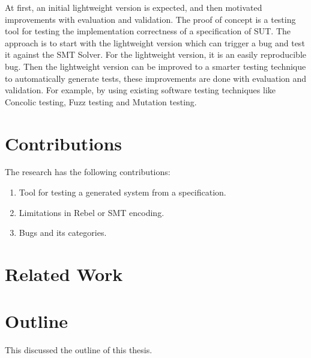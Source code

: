 At first, an initial lightweight version is expected, and then motivated
improvements with evaluation and validation. The proof of concept is a testing
tool for testing the implementation correctness of a specification of SUT. The
approach is to start with the lightweight version which can trigger a bug and
test it against the SMT Solver. For the lightweight version, it is an easily
reproducible bug. Then the lightweight version can be improved to a smarter
testing technique to automatically generate tests, these improvements are done
with evaluation and validation. For example, by using existing software testing
techniques like Concolic testing, Fuzz testing and Mutation testing.

\section{Contributions}
The research has the following contributions:

\begin{enumerate}
  \item Tool for testing a generated system from a specification.
  \item Limitations in Rebel or SMT encoding.
  \item Bugs and its categories.
\end{enumerate}

\section{Related Work}

\section{Outline}
This discussed the outline of this thesis.
